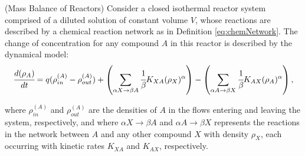 \documentclass[a4paper,11pt]{book}
\numberwithin{figure}{chapter}
\numberwithin{equation}{chapter}
\numberwithin{table}{chapter}
\newtheorem{theorem}{Theorem}[chapter]
\theoremstyle{definition}
\newcounter{boxed-theorem}
\newenvironment{boxed-theorem}[1]
{\begin{shaded} \begin{theorem}{#1}}
{\end{theorem} \end{shaded}}
\newcounter{boxed-definition}
\begin{document}
\begin{boxed-theorem}{(Mass Balance of Reactors)} \label{th:isoReactSys01}
    Consider a closed isothermal reactor system comprised of a diluted solution of constant volume $V$, whose reactions are described by a chemical reaction network as in Definition \ref{eq:chemNetwork}. The change of concentration for any compound $A$ in this reactor is described by the dynamical model:
    \begin{equation} \label{eq:isoModel1}
            \cfrac{d (\rho_A)}{dt} = q (\rho^{(A)}_{in} - \rho^{(A)}_{out}) + \left( \sum_{\alpha X \rightarrow \beta A} \cfrac{1}{\beta} K_{XA} (\rho_X)^{\alpha} \right) - \left(\sum_{\alpha A \rightarrow \beta X} \cfrac{1}{\beta} K_{AX} (\rho_A)^{\alpha} \right)
    ,\end{equation}

    \noindent where $\rho^{(A)}_{in}$ and $\rho^{(A)}_{out}$ are the densities of $A$ in the flows entering and leaving the system, respectively, and where $\alpha X \rightarrow \beta A$ and $\alpha A \rightarrow \beta X$ represents the reactions in the network between $A$ and any other compound $X$ with density $\rho_X$, each occurring with kinetic rates $K_{XA}$ and $K_{AX}$, respectively.
\end{boxed-theorem}
\end{document}

